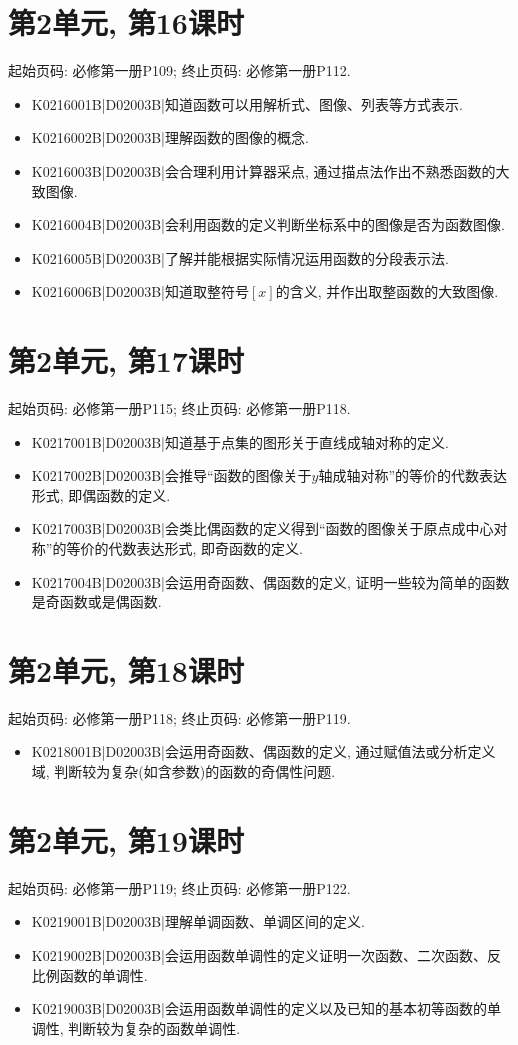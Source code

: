 \section*{第2单元, 第16课时}
起始页码: 必修第一册P109; 终止页码: 必修第一册P112.
\begin{itemize}
\item K0216001B|D02003B|知道函数可以用解析式、图像、列表等方式表示.
\item K0216002B|D02003B|理解函数的图像的概念.
\item K0216003B|D02003B|会合理利用计算器采点, 通过描点法作出不熟悉函数的大致图像.
\item K0216004B|D02003B|会利用函数的定义判断坐标系中的图像是否为函数图像.
\item K0216005B|D02003B|了解并能根据实际情况运用函数的分段表示法.
\item K0216006B|D02003B|知道取整符号$[x]$的含义, 并作出取整函数的大致图像.
\end{itemize}

\section*{第2单元, 第17课时}
起始页码: 必修第一册P115; 终止页码: 必修第一册P118.
\begin{itemize}
\item K0217001B|D02003B|知道基于点集的图形关于直线成轴对称的定义.
\item K0217002B|D02003B|会推导``函数的图像关于$y$轴成轴对称''的等价的代数表达形式, 即偶函数的定义.
\item K0217003B|D02003B|会类比偶函数的定义得到``函数的图像关于原点成中心对称''的等价的代数表达形式, 即奇函数的定义.
\item K0217004B|D02003B|会运用奇函数、偶函数的定义, 证明一些较为简单的函数是奇函数或是偶函数.
\end{itemize}

\section*{第2单元, 第18课时}
起始页码: 必修第一册P118; 终止页码: 必修第一册P119.
\begin{itemize}
\item K0218001B|D02003B|会运用奇函数、偶函数的定义, 通过赋值法或分析定义域, 判断较为复杂(如含参数)的函数的奇偶性问题.
\end{itemize}

\section*{第2单元, 第19课时}
起始页码: 必修第一册P119; 终止页码: 必修第一册P122.
\begin{itemize}
\item K0219001B|D02003B|理解单调函数、单调区间的定义.
\item K0219002B|D02003B|会运用函数单调性的定义证明一次函数、二次函数、反比例函数的单调性.
\item K0219003B|D02003B|会运用函数单调性的定义以及已知的基本初等函数的单调性, 判断较为复杂的函数单调性.
\end{itemize}

